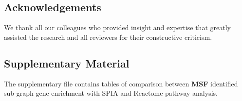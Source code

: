 \documentclass[twocolumn]{article}
\begin{document}
\subsection*{Acknowledgements}

We thank all our colleagues who provided insight and expertise that greatly assisted the research and all reviewers for their constructive criticism.

\subsection*{Supplementary Material}

The supplementary file contains tables of comparison between \textbf{MSF} identified sub-graph gene enrichment with SPIA and Reactome pathway analysis.
\clearpage
\end{document}

